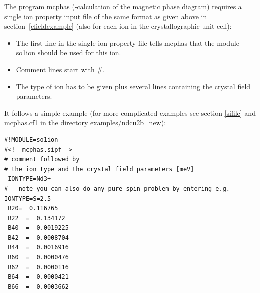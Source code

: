 The program {\prg mcphas} (-calculation of the magnetic phase diagram) 
requires a single ion
property input file of the same format as given above in
section~\ref{cfieldexample} (also for each ion in the
crystallographic unit cell):

\begin{itemize}
\item The first line in the single ion property file tells {\prg mcphas} that the module
{\prg so1ion} should be used for this ion. 
\item Comment lines start with \#. 
\item The type of ion has to be given plus
several lines containing the crystal field parameters. 
\end{itemize}

It follows a simple  example (for more complicated examples see section \ref{sifile} and 
{\prg mcphas.cf1} in the 
directory {\prg examples/ndcu2b\_new}):


\begin{verbatim}
#!MODULE=so1ion
#<!--mcphas.sipf-->
# comment followed by
# the ion type and the crystal field parameters [meV]
 IONTYPE=Nd3+
# - note you can also do any pure spin problem by entering e.g. IONTYPE=S=2.5 
 B20=  0.116765                                           
 B22  =  0.134172                                           
 B40  =  0.0019225                                          
 B42  =  0.0008704                                          
 B44  =  0.0016916                                          
 B60  =  0.0000476                                          
 B62  =  0.0000116                                          
 B64  =  0.0000421                                          
 B66  =  0.0003662                                          
\end{verbatim}


